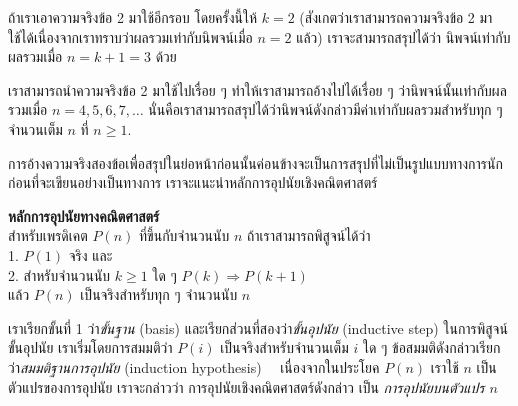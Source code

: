 ถ้า{\wbr}เรา{\wbr}เอา{\wbr}ความจริง{\wbr}ข้อ 2 มา{\wbr}ใช้{\wbr}อีก{\wbr}รอบ โดย{\wbr}ครั้งนี้{\wbr}ให้ $ k=2 $
(สังเกต{\wbr}ว่า{\wbr}เรา{\wbr}สามารถ{\wbr}ความจริง{\wbr}ข้อ 2 มา{\wbr}ใช้ได้{\wbr}เนื่องจาก{\wbr}เรา{\wbr}ทราบ{\wbr}ว่า{\wbr}ผลรวม{\wbr}เท่า{\wbr}กับ{\wbr}นิพจน์{\wbr}เมื่อ $
n=2 $ แล้ว) เรา{\wbr}จะ{\wbr}สามารถ{\wbr}สรุป{\wbr}ได้{\wbr}ว่า นิพจน์{\wbr}เท่า{\wbr}กับ{\wbr}ผลรวม{\wbr}เมื่อ $ n=k+1=3 $ ด้วย{\wbr}

เรา{\wbr}สามารถ{\wbr}นำ{\wbr}ความจริง{\wbr}ข้อ 2 มา{\wbr}ใช้{\wbr}ไป{\wbr}เรื่อย ๆ ทำ{\wbr}ให้{\wbr}เรา{\wbr}สามารถ{\wbr}อ้าง{\wbr}ไป{\wbr}ได้{\wbr}เรื่อย ๆ
ว่า{\wbr}นิพจน์{\wbr}นั้น{\wbr}เท่า{\wbr}กับ{\wbr}ผลรวม{\wbr}เมื่อ $ n=4,5,6,7,\ldots $
นั่น{\wbr}คือ{\wbr}เรา{\wbr}สามารถ{\wbr}สรุป{\wbr}ได้{\wbr}ว่า{\wbr}นิพจน์{\wbr}ดังกล่าว{\wbr}มี{\wbr}ค่า{\wbr}เท่า{\wbr}กับ{\wbr}ผลรวม{\wbr}สำหรับ{\wbr}ทุก ๆ จำนวนเต็ม $ n $ ที่{\wbr}
$ n\geq 1 $.

การ{\wbr}อ้าง{\wbr}ความจริง{\wbr}สอง{\wbr}ข้อ{\wbr}เพื่อ{\wbr}สรุป{\wbr}ใน{\wbr}ย่อหน้า{\wbr}ก่อน{\wbr}นั้น{\wbr}ค่อนข้าง{\wbr}จะ{\wbr}เป็น{\wbr}การ{\wbr}สรุป{\wbr}ที่{\wbr}ไม่{\wbr}เป็น{\wbr}รูปแบบ{\wbr}ทางการ{\wbr}นัก ก่อน{\wbr}ที่{\wbr}จะ{\wbr}เขียน{\wbr}อย่าง{\wbr}เป็นทางการ เรา{\wbr}จะ{\wbr}แนะนำ{\wbr}หลักการ{\wbr}อุปนัย{\wbr}เชิง{\wbr}คณิตศาสตร์{\wbr}

\framed\noindent
{\bf หลักการ{\wbr}อุปนัย{\wbr}ทาง{\wbr}คณิตศาสตร์}\\
สำหรับ{\wbr}เพรดิเคต $P(n)$ ที่{\wbr}ขึ้น{\wbr}กับ{\wbr}จำนวนนับ $n$ ถ้า{\wbr}เรา{\wbr}สามารถ{\wbr}พิสูจน์{\wbr}ได้{\wbr}ว่า\\
1. $P(1)$ จริง และ\\
2. สำหรับ{\wbr}จำนวนนับ $k\geq 1$ ใด ๆ $P(k)\Rightarrow P(k+1)$\\
แล้ว $P(n)$ เป็นจริง{\wbr}สำหรับ{\wbr}ทุก ๆ จำนวนนับ $n$
\endframed

เรา{\wbr}เรียก{\wbr}ขั้น{\wbr}ที่ 1 ว่า{\em ขั้น{\wbr}ฐาน} (basis) และ{\wbr}เรียก{\wbr}ส่วน{\wbr}ที่{\wbr}สอง{\wbr}ว่า{\em ขั้น{\wbr}อุปนัย}
(inductive step) ใน{\wbr}การ{\wbr}พิสูจน์{\wbr}ขั้น{\wbr}อุปนัย เรา{\wbr}เริ่ม{\wbr}โดย{\wbr}การ{\wbr}สมมติ{\wbr}ว่า $ P(i) $
เป็นจริง{\wbr}สำหรับ{\wbr}จำนวนเต็ม $i$ ใด ๆ ข้อสมมติ{\wbr}ดังกล่าว{\wbr}เรียก{\wbr}ว่า{\em สมมติฐาน{\wbr}การ{\wbr}อุปนัย}
(induction hypothesis) \ \ เนื่องจาก{\wbr}ใน{\wbr}ประโยค $P(n)$ เรา{\wbr}ใช้ $n$
เป็น{\wbr}ตัวแปร{\wbr}ของ{\wbr}การ{\wbr}อุปนัย เรา{\wbr}จะ{\wbr}กล่าว{\wbr}ว่า การ{\wbr}อุปนัย{\wbr}เชิง{\wbr}คณิตศาสตร์{\wbr}ดังกล่าว เป็น{\em
  การ{\wbr}อุปนัย{\wbr}บน{\wbr}ตัวแปร $n$}


